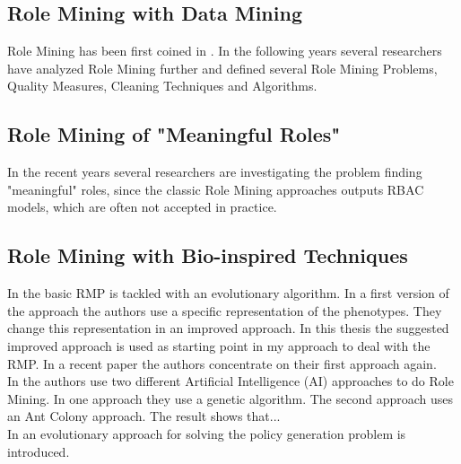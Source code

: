 \subsection{Role Mining with Data Mining}
Role Mining has been first coined in \cite{Kuhlmann}. In the following years several researchers have analyzed Role Mining further and defined several Role Mining Problems, Quality Measures, Cleaning Techniques and Algorithms.
\subsection{Role Mining of "Meaningful Roles"}
In the recent years several researchers are investigating the problem finding "meaningful" roles, since the classic Role Mining approaches outputs RBAC models, which are often not accepted in practice.
\subsection{Role Mining with Bio-inspired Techniques}
In \cite{Igor} the basic RMP is tackled with an evolutionary algorithm. In a first version of the approach the authors use a specific representation of the phenotypes. They change this representation in an improved approach. In this thesis the suggested improved approach is used as starting point in my approach to deal with the RMP. In a recent paper \cite{Igor2} the authors concentrate on their first approach again.\\
In \cite{DuChang} the authors use two different Artificial Intelligence (AI) approaches to do Role Mining. In one approach they use a genetic algorithm. The second approach uses an Ant Colony approach. The result shows that...\\
In \cite{paper} an evolutionary approach for solving the policy generation problem is introduced. 


